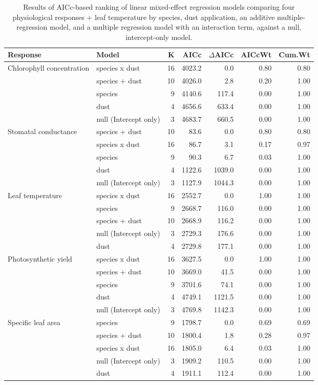 \begin{table}[!h]
\centering
\begin{tabular}{llrrrrr}
  \hline
Response & Model & K & AICc & $\Delta$AICc & AICcWt & Cum.Wt \\ 
  \hline
Chlorophyll concentration & species x dust & 16 & 4023.2 & 0.0 & 0.80 & 0.80 \\ 
   & species + dust & 10 & 4026.0 & 2.8 & 0.20 & 1.00 \\ 
   & species & 9 & 4140.6 & 117.4 & 0.00 & 1.00 \\ 
   & dust & 4 & 4656.6 & 633.4 & 0.00 & 1.00 \\ 
   & null (Intercept only) & 3 & 4683.7 & 660.5 & 0.00 & 1.00 \\ 
  Stomatal conductance & species + dust & 10 & 83.6 & 0.0 & 0.80 & 0.80 \\ 
   & species x dust & 16 & 86.7 & 3.1 & 0.17 & 0.97 \\ 
   & species & 9 & 90.3 & 6.7 & 0.03 & 1.00 \\ 
   & dust & 4 & 1122.6 & 1039.0 & 0.00 & 1.00 \\ 
   & null (Intercept only) & 3 & 1127.9 & 1044.3 & 0.00 & 1.00 \\ 
  Leaf temperature & species x dust & 16 & 2552.7 & 0.0 & 1.00 & 1.00 \\ 
   & species & 9 & 2668.7 & 116.0 & 0.00 & 1.00 \\ 
   & species + dust & 10 & 2668.9 & 116.2 & 0.00 & 1.00 \\ 
   & null (Intercept only) & 3 & 2729.3 & 176.6 & 0.00 & 1.00 \\ 
   & dust & 4 & 2729.8 & 177.1 & 0.00 & 1.00 \\ 
  Photosynthetic yield & species x dust & 16 & 3627.5 & 0.0 & 1.00 & 1.00 \\ 
   & species + dust & 10 & 3669.0 & 41.5 & 0.00 & 1.00 \\ 
   & species & 9 & 3701.6 & 74.1 & 0.00 & 1.00 \\ 
   & dust & 4 & 4749.1 & 1121.5 & 0.00 & 1.00 \\ 
   & null (Intercept only) & 3 & 4769.8 & 1142.3 & 0.00 & 1.00 \\ 
  Specific leaf area & species & 9 & 1798.7 & 0.0 & 0.69 & 0.69 \\ 
   & species + dust & 10 & 1800.4 & 1.8 & 0.28 & 0.97 \\ 
   & species x dust & 16 & 1805.0 & 6.4 & 0.03 & 1.00 \\ 
   & null (Intercept only) & 3 & 1909.2 & 110.5 & 0.00 & 1.00 \\ 
   & dust & 4 & 1911.1 & 112.4 & 0.00 & 1.00 \\ 
   \hline
\end{tabular}
\caption{Results of AICc-based ranking of linear mixed-effect regression models comparing four physiological responses + leaf temperature by species, dust application, an additive multiple-regression model, and a multiple regression model with an interaction term, against a null, intercept-only model.} 
\label{tab:cropAIC}
\end{table}
